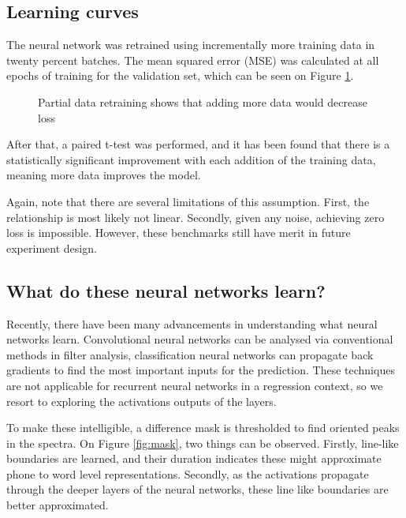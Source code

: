 \documentclass[a4paper]{article}
\begin{document}
\subsection{Learning curves}

The neural network was retrained using incrementally more training data in twenty
percent batches. The mean squared error (MSE)
was calculated at all epochs of training for the validation set, which
can be seen on Figure \ref{learning_curve}.

\begin{figure}[t]
  \begin{center}
    \scalebox{0.50}{}
    \caption{Partial data retraining shows that adding more data would
      decrease loss}
      \label{learning_curve}
\end{center}
\end{figure}


After that, a paired t-test was performed, and it has been found that there is
a statistically significant improvement with each addition of the training data,
meaning more data improves the model.

Again, note that there are several limitations of this assumption. First, the
relationship is most likely not linear. Secondly, given any noise, achieving
zero loss is impossible. However, these benchmarks still have merit in
future experiment design.

\subsection{What do these neural networks learn?} \label{section:visualisation}


Recently, there have been many advancements in understanding what neural networks learn.
Convolutional neural networks can be analysed via conventional methods in filter analysis,
classification neural networks can propagate back gradients to find the most important inputs for
the prediction. These techniques are not applicable for recurrent neural networks in a regression
context, so we resort to exploring the activations outputs of the layers.

To make these intelligible, a difference mask is thresholded to find oriented peaks in the spectra.
On Figure \ref{fig:mask}, two things can be observed. Firstly, line-like boundaries are learned, and their duration indicates these might approximate phone to word level representations. Secondly, as the activations propagate through the deeper layers of the neural networks, these line like boundaries are better approximated.
\end{document}
